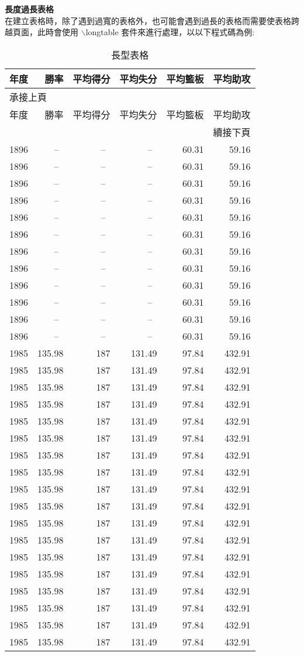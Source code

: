 \textbf{長度過長表格}\\
在建立表格時，除了遇到過寬的表格外，也可能會遇到過長的表格而需要使表格跨越頁面，此時會使用 {\A $\backslash$longtable} 套件來進行處理，以以下程式碼為例:
\begin{longtable}{@{}lrrrrr@{}}
\caption{長型表格}
\label{tb:longtable}\\
\toprule
年度& 勝率& 平均得分 & 平均失分 & 平均籃板 &平均助攻\\
\midrule
\endfirsthead
\multicolumn{6}{l}{承接上頁}\\[2pt]
\toprule
年度& 勝率& 平均得分 & 平均失分 & 平均籃板 &平均助攻\\
\midrule
\endhead
\midrule
\multicolumn{6}{r}{續接下頁}
\endfoot
\endlastfoot
1896&--~&--~&--~&60.31&59.16\\
1896&--~&--~&--~&60.31&59.16\\
1896&--~&--~&--~&60.31&59.16\\
1896&--~&--~&--~&60.31&59.16\\
1896&--~&--~&--~&60.31&59.16\\
1896&--~&--~&--~&60.31&59.16\\
1896&--~&--~&--~&60.31&59.16\\
1896&--~&--~&--~&60.31&59.16\\
1896&--~&--~&--~&60.31&59.16\\
1896&--~&--~&--~&60.31&59.16\\
1896&--~&--~&--~&60.31&59.16\\
1896&--~&--~&--~&60.31&59.16\\
1896&--~&--~&--~&60.31&59.16\\
1985&135.98&187&131.49&97.84&432.91\\
1985&135.98&187&131.49&97.84&432.91\\
1985&135.98&187&131.49&97.84&432.91\\
1985&135.98&187&131.49&97.84&432.91\\
1985&135.98&187&131.49&97.84&432.91\\
1985&135.98&187&131.49&97.84&432.91\\
1985&135.98&187&131.49&97.84&432.91\\
1985&135.98&187&131.49&97.84&432.91\\
1985&135.98&187&131.49&97.84&432.91\\
1985&135.98&187&131.49&97.84&432.91\\
1985&135.98&187&131.49&97.84&432.91\\
1985&135.98&187&131.49&97.84&432.91\\
1985&135.98&187&131.49&97.84&432.91\\
1985&135.98&187&131.49&97.84&432.91\\
1985&135.98&187&131.49&97.84&432.91\\
1985&135.98&187&131.49&97.84&432.91\\
1985&135.98&187&131.49&97.84&432.91\\
1985&135.98&187&131.49&97.84&432.91\\

\bottomrule
\end{longtable}

